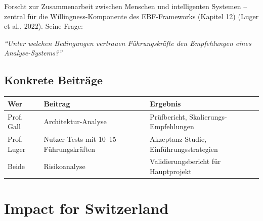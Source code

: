 \documentclass[11pt,a4paper]{article}
\begin{document}
Forscht zur Zusammenarbeit zwischen Menschen und intelligenten Systemen -- zentral für die Willingness-Komponente des EBF-Frameworks (Kapitel 12) (Luger et al., 2022). Seine Frage:

\textit{``Unter welchen Bedingungen vertrauen Führungskräfte den Empfehlungen eines Analyse-Systems?''}

\subsection{Konkrete Beiträge}

\begin{table}[h]
\centering
\begin{tabular}{@{}L{3cm}L{5cm}L{5cm}@{}}
\toprule
\textbf{Wer} & \textbf{Beitrag} & \textbf{Ergebnis} \\
\midrule
Prof. Gall & Architektur-Analyse & Prüfbericht, Skalierungs-Empfehlungen \\
Prof. Luger & Nutzer-Tests mit 10--15 Führungskräften & Akzeptanz-Studie, Einführungsstrategien \\
Beide & Risikoanalyse & Validierungsbericht für Hauptprojekt \\
\bottomrule
\end{tabular}
\end{table}

\vspace{1cm}

\newpage


\section{Impact for Switzerland}
\end{document}

